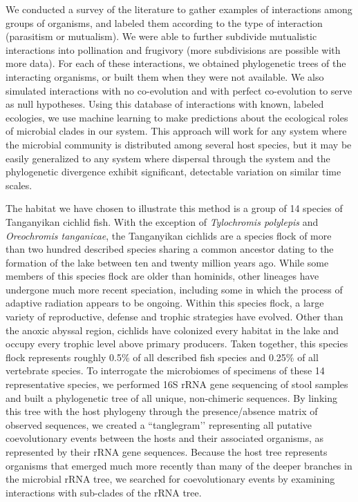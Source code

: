 We conducted a survey of the literature to gather examples of interactions among groups of organisms, and labeled them according to the type of interaction (parasitism or mutualism). We were able to further subdivide mutualistic interactions into pollination and frugivory (more subdivisions are possible with more data). For each of these interactions, we obtained phylogenetic trees of the interacting organisms, or built them when they were not available. We also simulated interactions with no co-evolution and with perfect co-evolution to serve as null hypotheses. Using this database of interactions with known, labeled ecologies, we use machine learning to make predictions about the ecological roles of microbial clades in our system. 
This approach will work for any system where the microbial community is distributed among several host species, but it may be easily generalized to any system where dispersal through the system and the phylogenetic divergence exhibit significant, detectable variation on similar time scales.

The habitat we have chosen to illustrate this method is a group of 14 species of Tanganyikan cichlid fish. With the exception of {\em Tylochromis polylepis} and {\em Oreochromis tanganicae}, the Tanganyikan cichlids are a species flock of more than two hundred described species sharing a common ancestor dating to the formation of the lake between ten and twenty million years ago. While some members of this species flock are older than hominids, other lineages have undergone much more recent speciation, including some in which the process of adaptive radiation appears to be ongoing. Within this species flock, a large variety of reproductive, defense and trophic strategies have evolved. Other than the anoxic abyssal region, cichlids have colonized every habitat in the lake and occupy every trophic level above primary producers. Taken together, this species flock represents roughly 0.5\% of all described fish species and 0.25\% of all vertebrate species. To interrogate the microbiomes of specimens of these 14 representative species, we performed 16S rRNA gene sequencing of stool samples and built a phylogenetic tree of all unique, non-chimeric sequences. By linking this tree with the host phylogeny through the presence/absence matrix of observed sequences, we created a ``tanglegram’’ representing all putative coevolutionary events between the hosts and their associated organisms, as represented by their rRNA gene sequences. Because the host tree represents organisms that emerged much more recently than many of the deeper branches in the microbial rRNA tree, we searched for coevolutionary events by examining interactions with sub-clades of the rRNA tree.